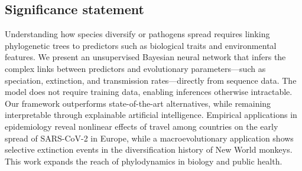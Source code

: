 \subsection*{Significance statement}
Understanding how species diversify or pathogens spread requires linking phylogenetic trees to predictors such as biological traits and environmental features.
We present an unsupervised Bayesian neural network that infers the complex links between predictors and evolutionary parameters---such as speciation, extinction, and transmission rates---directly from sequence data.
The model does not require training data, enabling inferences otherwise intractable.
Our framework outperforms state-of-the-art alternatives, while remaining interpretable through explainable artificial intelligence.
Empirical applications in epidemiology reveal nonlinear effects of travel among countries on the early spread of SARS-CoV-2 in Europe, while a macroevolutionary application shows selective extinction events in the diversification history of New World monkeys.
This work expands the reach of phylodynamics in biology and public health.
